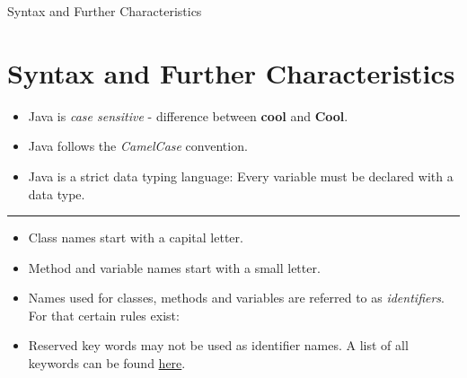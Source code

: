 \documentclass[11pt]{beamer}
\newcommand{\nologo}{\setbeamertemplate{logo}{}}
\newcommand{\reducedfontsizeextrasmall}{\fontsize{8pt}{9.6}\selectfont}
\begin{document}
	{\nologo
	\begin{frame}{Syntax and Further Characteristics}
		\section{Syntax and Further Characteristics}
		{\reducedfontsizeextrasmall
		\begin{itemize}
			\item{Java is \textit{case sensitive} - difference between \textbf{cool} and \textbf{Cool}.}
			\item{Java follows the \textit{CamelCase} convention.}
			\item{Java is a strict data typing language: Every variable must be declared with a data type.}
		\end{itemize}
		\noindent\rule{\textwidth}{0.1pt}
		\begin{itemize}
			\item{Class names start with a capital letter.}
			\item{Method and variable names start with a small letter.}
			\item{Names used for classes, methods and variables are referred to as \textit{identifiers}. For that certain rules exist:}
			\item{Reserved key words may not be used as identifier names. A list of all keywords can be found \href{https://docs.oracle.com/javase/tutorial/java/nutsandbolts/_keywords.html}{here}.}
		\end{itemize}
		}
	\end{frame}
	}
	
\end{document}
